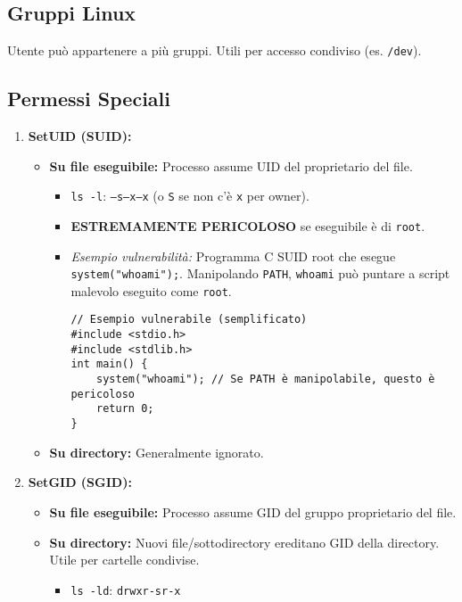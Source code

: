 \subsection{Gruppi Linux}
Utente può appartenere a più gruppi. Utili per accesso condiviso (es. \texttt{/dev}).

\subsection{Permessi Speciali}
\begin{enumerate}
    \item \textbf{SetUID (SUID):}
    \begin{itemize}
        \item \textbf{Su file eseguibile:} Processo assume UID del proprietario del file.
        \begin{itemize}
            \item \texttt{ls -l}: \texttt{---s--x--x} (o \texttt{S} se non c'è \texttt{x} per owner).
            \item \textbf{ESTREMAMENTE PERICOLOSO} se eseguibile è di \texttt{root}.
            \item \textit{Esempio vulnerabilità:} Programma C SUID root che esegue \texttt{system("whoami");}. Manipolando \texttt{PATH}, \texttt{whoami} può puntare a script malevolo eseguito come \texttt{root}.
            \begin{verbatim}
// Esempio vulnerabile (semplificato)
#include <stdio.h>
#include <stdlib.h>
int main() {
    system("whoami"); // Se PATH è manipolabile, questo è pericoloso
    return 0;
}
            \end{verbatim}
        \end{itemize}
        \item \textbf{Su directory:} Generalmente ignorato.
    \end{itemize}

    \item \textbf{SetGID (SGID):}
    \begin{itemize}
        \item \textbf{Su file eseguibile:} Processo assume GID del gruppo proprietario del file.
        \item \textbf{Su directory:} Nuovi file/sottodirectory ereditano GID della directory. Utile per cartelle condivise.
        \begin{itemize}
            \item \texttt{ls -ld}: \texttt{drwxr-sr-x}
        \end{itemize}
    \end{itemize}


\end{enumerate}
